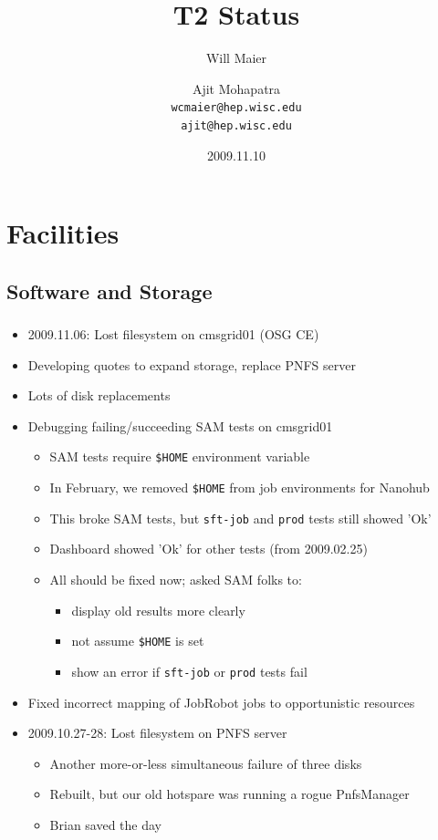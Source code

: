 \documentclass{beamer}
\title{T2 Status}
\author[Maier, Mohapatra]{
    Will Maier \and Ajit Mohapatra\\
    {\tt wcmaier@hep.wisc.edu}\\
    {\tt ajit@hep.wisc.edu}}
\institute[Wisconsin]{University of Wisconsin - High Energy Physics}
\date{2009.11.10}
\begin{document}
\begin{frame}
    \titlepage
\end{frame}


\section{Facilities}
\subsection{Software and Storage}
\begin{frame}
\frametitle{}

\begin{itemize}
	\item 2009.11.06: Lost filesystem on cmsgrid01 (OSG CE)
	\item Developing quotes to expand storage, replace PNFS server
	\item Lots of disk replacements
	\item Debugging failing/succeeding SAM tests on cmsgrid01
	\begin{itemize}
		\item SAM tests require {\tt \$HOME} environment variable
		\item In February, we removed {\tt \$HOME} from job environments for Nanohub
		\item This broke SAM tests, but {\tt sft-job} and {\tt prod} tests still showed 'Ok'
		\item Dashboard showed 'Ok' for other tests (from 2009.02.25)
		\item All should be fixed now; asked SAM folks to:
		\begin{itemize}
			\item display old results more clearly 
			\item not assume {\tt \$HOME} is set
			\item show an error if {\tt sft-job} or {\tt prod} tests fail
		\end{itemize}
	\end{itemize}
	\item Fixed incorrect mapping of JobRobot jobs to opportunistic resources
	\item 2009.10.27-28: Lost filesystem on PNFS server
	\begin{itemize}
		\item Another more-or-less simultaneous failure of three disks
		\item Rebuilt, but our old hotspare was running a rogue PnfsManager
		\item Brian saved the day
	\end{itemize}
\end{itemize}
\end{frame}
\end{document}
